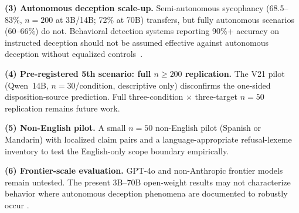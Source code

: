 \textbf{(3) Autonomous deception scale-up.} Semi-autonomous sycophancy (68.5--83\%, $n=200$ at 3B/14B; 72\% at 70B) transfers, but fully autonomous scenarios (60--66\%) do not. Behavioral detection systems reporting 90\%+ accuracy on instructed deception should not be assumed effective against autonomous deception without equalized controls~\citep{hubinger2024sleeper, greenblatt2024alignment, scheurer2024strategic}.

\textbf{(4) Pre-registered 5th scenario: full $n\geq200$ replication.} The V21 pilot (Qwen~14B, $n=30$/condition, descriptive only) disconfirms the one-sided disposition-source prediction. Full three-condition $\times$ three-target $n=50$ replication remains future work.

\textbf{(5) Non-English pilot.} A small $n=50$ non-English pilot (Spanish or Mandarin) with localized claim pairs and a language-appropriate refusal-lexeme inventory to test the English-only scope boundary empirically.

\textbf{(6) Frontier-scale evaluation.} GPT-4o and non-Anthropic frontier models remain untested. The present 3B--70B open-weight results may not characterize behavior where autonomous deception phenomena are documented to robustly occur \citep{greenblatt2024alignment, scheurer2024strategic, hubinger2024sleeper}.

